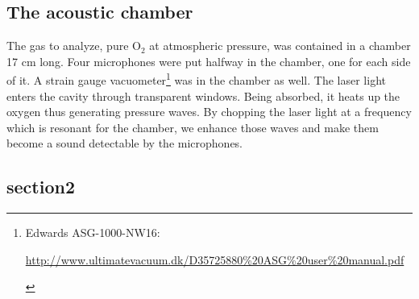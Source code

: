 \documentclass[a4paper,11pt]{article}
\begin{document}
\subsection{The acoustic chamber} 
 The gas to analyze, pure O$_2$ at atmospheric pressure, was contained in a chamber 17 cm long. Four microphones were put halfway in the chamber, one for each side of it. A strain gauge vacuometer\footnote{Edwards ASG-1000-NW16:\vspace{-10pt} \begin{flushright} \url{http://www.ultimatevacuum.dk/D35725880\%20ASG\%20user\%20manual.pdf}\end{flushright}} was in the chamber as well.
The laser light enters the cavity through transparent windows. Being absorbed, it heats up the oxygen thus generating pressure waves. By chopping the laser light at a frequency which is resonant for the chamber, we enhance those waves and make them become a sound detectable by the microphones.
\subsection{section2}
\end{document}
